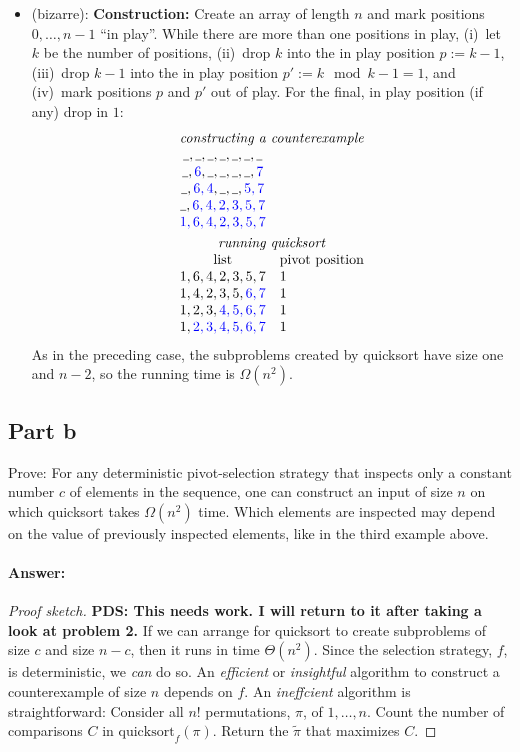 \documentclass[a4paper]{article}
\newcommand*{\dave}[1]{{\color{red}\textbf{PDS: #1}}}
\begin{document}
\begin{itemize}
	\item (bizarre):
	\textbf{Construction:}
	Create an array of length $n$ and mark positions $0, \ldots, n-1$ ``in play''.
	While there are more than one positions in play,
	(i)~let $k$ be the number of positions,
	(ii)~drop $k$ into the in play position $p := k-1$,
	(iii)~drop $k-1$ into the in play position $p' := k \mod k-1 = 1$, and
	(iv)~mark positions $p$ and $p'$ out of play.
	For the final, in play position (if any) drop in $1$:
	\[
		\begin{array}{cl}
		\multicolumn{2}{c}{\text{\emph{constructing a counterexample}}} \\
		\HOLE, \HOLE, \HOLE, \HOLE, \HOLE, \HOLE, \HOLE \\
		\HOLE, \USED{6}, \HOLE, \HOLE, \HOLE, \HOLE, \USED{7} \\
		\HOLE, \USED{6, 4}, \HOLE, \HOLE, \USED{5, 7} \\
		\HOLE, \USED{6, 4, 2, 3, 5, 7} \\
		\USED{1, 6, 4, 2, 3, 5, 7} \\[\jot]
		\multicolumn{2}{c}{\text{\emph{running quicksort}}} \\
		\text{list} & \text{pivot position} \\
		1, 6, 4, 2, 3, 5, 7 & 1\\
		1, 4, 2, 3, 5, \USED{6, 7} & 1\\
		1, 2, 3, \USED{4, 5, 6, 7} & 1\\
		1, \USED{2, 3, 4, 5, 6, 7} & 1\\
		\end{array}
	\]
	As in the preceding case, the subproblems created by quicksort have size one and $n-2$, so the running time is $\Omega(n^2)$.
\end{itemize}

\subsection{Part b}

Prove: For any deterministic pivot-selection strategy that inspects only a constant number $c$ of elements in the sequence, one can construct an input of size $n$ on which quicksort takes $\Omega(n^2)$ time.
Which elements are inspected may depend on the value of previously inspected elements, like in the third example above.

\paragraph{Answer:}
\begin{proof}[Proof sketch]
\dave{This needs work.
	I will return to it after taking a look at problem 2.}
If we can arrange for quicksort to create subproblems of size $c$ and size $n-c$, then it runs in time $\Theta(n^2)$.
Since the selection strategy, $f$, is deterministic, we \emph{can} do so.
An \emph{efficient} or \emph{insightful} algorithm to construct a counterexample of size $n$ depends on $f$.
An \emph{ineffcient} algorithm is straightforward:
Consider all $n!$ permutations, $\pi$, of $1, \ldots, n$.
Count the number of comparisons $C$ in $\text{quicksort}_f(\pi)$.
Return the $\tilde \pi$ that maximizes $C$.
\end{proof}
\end{document}
